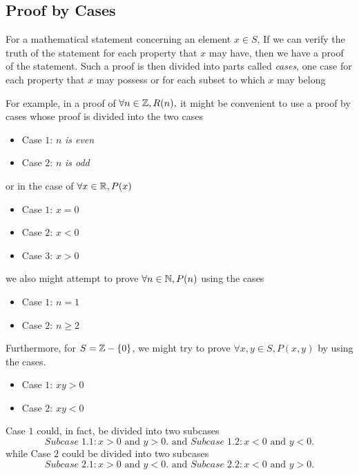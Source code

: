 \subsection{Proof by Cases}
\begin{defi}
    For a mathematical statement concerning an element $x \in S$,  If we can
    verify the truth of the statement for each property that $x$ may have, then
    we have a proof of the statement. Such a proof is then divided into parts
    called \emph{cases}, one case for each property that $x$ may possess or for
    each subset to which $x$ may belong
\end{defi}
For example, in a proof of $\forall n \in \mathbb{Z}, R(n),$ it might be convenient
to use a proof by cases whose proof is divided into the two cases
\begin{itemize}
        \item Case $1$: $n$ \textit{is even}
        \item Case $2$: $n$ \textit{is odd}
\end{itemize}
or in the case of $\forall x \in \mathbb{R}, P(x)$
\begin{itemize}
        \item Case $1$: $x=0$
        \item Case $2$: $x<0$
        \item Case $3$: $x>0$
\end{itemize}
we also might attempt to prove $\forall n \in \mathbb{N}, P(n)$ using the cases
\begin{itemize}
        \item Case $1$: $n=1$
        \item Case $2$: $n\geq 2$
\end{itemize}
Furthermore, for $S=\mathbb{Z}-\{0\}$, we might try to prove $\forall x,y \in S,
P(x,y)$ by using the cases.
\begin{itemize}
     \item Case $1$: $xy>0$
     \item Case $2$: $xy<0$
\end{itemize}
Case $1$ could, in fact, be divided into two subcases
\begin{equation*}
    Subcase\;1.1: x > 0 \text{ and } y > 0. \text{ and } Subcase\;1.2: x < 0 \text{ and } y < 0.
\end{equation*}
while Case $2$ could be divided into two subcases
\begin{equation*}
    Subcase\;2.1: x > 0 \text{ and } y < 0. \text{ and } Subcase\;2.2: x < 0 \text{ and } y > 0.
\end{equation*}
